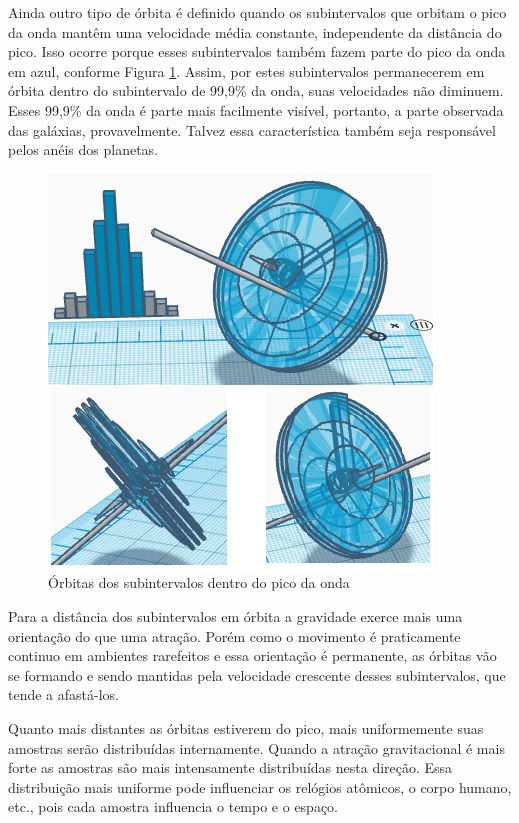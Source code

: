 Ainda outro tipo de órbita é definido quando os subintervalos que orbitam o pico da onda mantêm uma velocidade média constante, independente da distância do pico. Isso ocorre porque esses subintervalos também fazem parte do pico da onda em azul, conforme Figura \ref{fig:consciousness_circular_orbit_system}. Assim, por estes subintervalos permanecerem em órbita dentro do subintervalo de 99,9\% da onda, suas velocidades não diminuem. Esses 99,9\% da onda é parte mais facilmente visível, portanto, a parte observada das galáxias, provavelmente. Talvez essa característica também seja responsável pelos anéis dos planetas. 
	\begin{figure}[H]
	\caption{Órbitas dos subintervalos dentro do pico da onda}
	\label{fig:consciousness_circular_orbit_system}
	\centering
	\includegraphics[scale=.9]{sections/images/consciousness_circular_orbit_system.jpg}
	\end{figure}

Para a distância dos subintervalos em órbita a gravidade exerce mais uma orientação do que uma atração. Porém como o movimento é praticamente continuo em ambientes rarefeitos e essa orientação é permanente, as órbitas vão se formando e sendo mantidas pela velocidade crescente desses subintervalos, que tende a afastá-los. 

Quanto mais distantes as órbitas estiverem do pico, mais uniformemente suas amostras serão distribuídas internamente. Quando a atração gravitacional é mais forte as amostras são mais intensamente distribuídas nesta direção. Essa distribuição mais uniforme pode influenciar os relógios atômicos, o corpo humano, etc., pois cada amostra influencia o tempo e o espaço.

